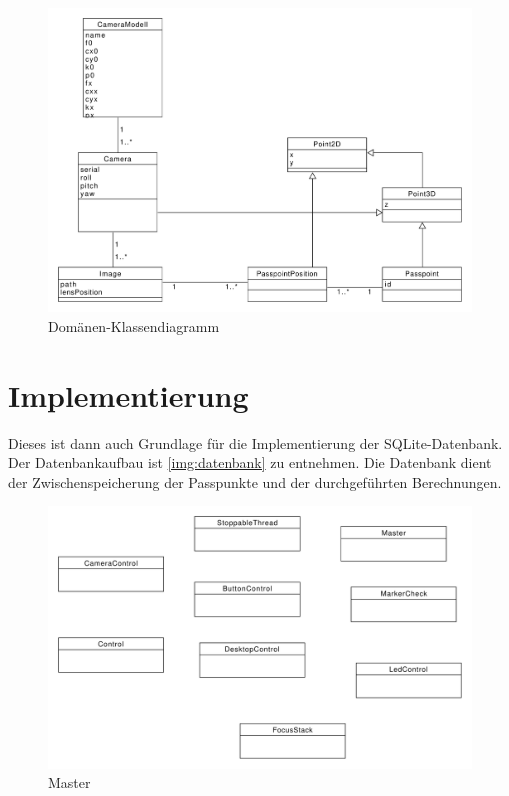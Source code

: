 \documentclass[./00PhotoBox.tex]{subfiles}
\begin{document}
\begin{figure}[!htbp]
    \centering
    \includegraphics[width=1\textwidth]{./img/uml/uml_domain.pdf}
    \centering
    \caption{Domänen-Klassendiagramm} %
    \label{img:dokladia} %
\end{figure}

\section{Implementierung}
\label{sec:Implementierung}
Dieses ist dann auch Grundlage für die Implementierung der SQLite-Datenbank. Der Datenbankaufbau ist \autoref{img:datenbank} zu entnehmen. Die Datenbank dient der Zwischenspeicherung der Passpunkte und der durchgeführten Berechnungen.

\begin{figure}[!htbp]
    \centering
    \includegraphics[width=1\textwidth]{./img/uml/uml_master_classdiagramm.pdf}
    \centering
    \caption{Master} %
    \label{img:master} %
\end{figure}
\end{document}
